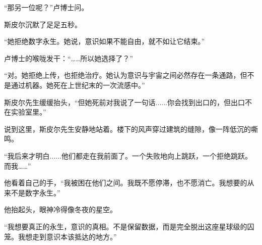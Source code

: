 “那另一位呢？”卢博士问。

斯皮尔沉默了足足五秒。

“她拒绝数字永生。她说，意识如果不能自由，就不如让它结束。”

卢博士的喉咙发干：“……所以她选择了？”

“对。她拒绝上传，也拒绝治疗。她认为意识与宇宙之间必然存在一条通路，但不是通过机器。她死在上世纪末的一次流感中。”

斯皮尔先生缓缓抬头，“但她死前对我说了一句话......你会找到出口的，但出口不在实验室里。”

说到这里，斯皮尔先生安静地站着。楼下的风声穿过建筑的缝隙，像一阵低沉的嘶鸣。

“我后来才明白......他们都走在我前面了。一个失败地向上跳跃，一个拒绝跳跃。而我……”

他看着自己的手，“我被困在他们之间。我既不愿停滞，也不愿消亡。我想要的从来不是数字永生。”

他抬起头，眼神冷得像冬夜的星空。

“我想要真正的永生，意识的真相。不是保留数据，而是完全脱出这座星球级的囚笼。我想走到意识本该抵达的地方。”
